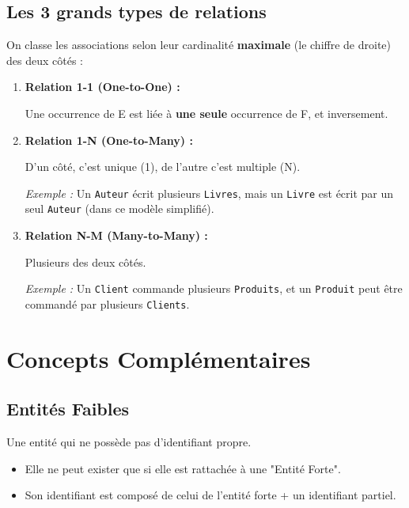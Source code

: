\subsection{ Les 3 grands types de relations }
On classe les associations selon leur cardinalité \textbf{maximale} (le chiffre de droite) des deux côtés :

\begin{enumerate}
\item \textbf{Relation 1-1 (One-to-One) :}

Une occurrence de E est liée à \textbf{une seule} occurrence de F, et inversement.
\item \textbf{Relation 1-N (One-to-Many) :}

D'un côté, c'est unique (1), de l'autre c'est multiple (N).

\medskip

\textit{Exemple :} Un \texttt{Auteur} écrit plusieurs \texttt{Livres}, mais un \texttt{Livre} est écrit par un seul \texttt{Auteur} (dans ce modèle simplifié).

\item \textbf{Relation N-M (Many-to-Many) :}

Plusieurs des deux côtés.

\medskip

\textit{Exemple :} Un \texttt{Client} commande plusieurs \texttt{Produits}, et un \texttt{Produit} peut être commandé par plusieurs \texttt{Clients}.
\end{enumerate}

\section{ Concepts Complémentaires }

\subsection{ Entités Faibles }

\begin{definition}
Une entité qui ne possède pas d'identifiant propre.
\end{definition}

\begin {itemize}
\item Elle ne peut exister que si elle est rattachée à une "Entité Forte".
\item Son identifiant est composé de celui de l'entité forte + un identifiant partiel.
\end{itemize}

